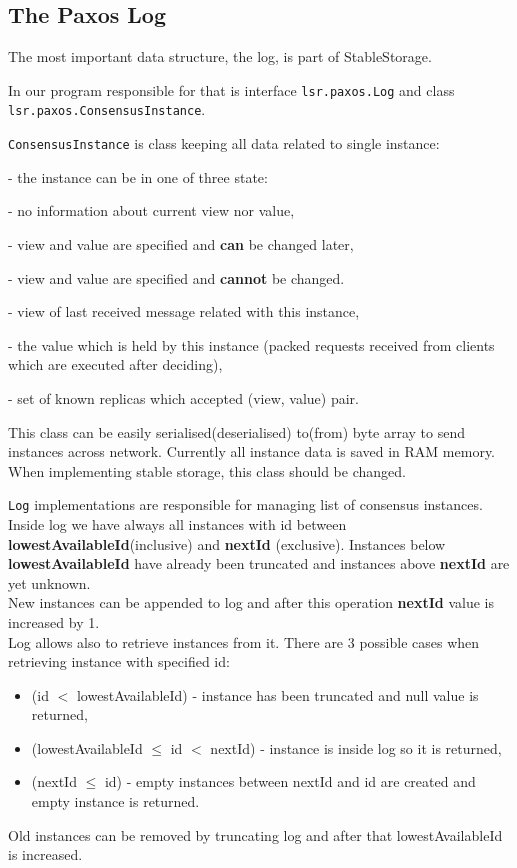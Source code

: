 \subsection{The Paxos Log}
\label{subsubsec:the_paxos_log}
The most important data structure, the log, is part of StableStorage.

In our program responsible for that is interface \texttt{lsr.paxos.Log} and class \texttt{lsr.paxos.Con\-sen\-susInstance}.

\texttt{ConsensusInstance} is class keeping all data related to single instance:
\begin{description}
  \setlength{\itemindent}{0pt}
  \item[state] - the instance can be in one of three state:
  \begin{description}
    \setlength{\itemindent}{0pt}
    \item[\tiny UNKNOWN] - no information about current view nor value,
    \item[\tiny KNOWN] - view and value are specified and \textbf{can} be changed later,
    \item[\tiny DECIDED] - view and value are specified and \textbf{cannot} be changed.
  \end{description}
  \item[view] - view of last received message related with this instance,
  \item[value] - the value which is held by this instance (packed requests received from clients which are executed after deciding),
  \item[accepts] - set of known replicas which accepted (view, value) pair.
\end{description}
This class can be easily serialised(deserialised) to(from) byte array to send instances across network. Currently all instance data is saved in RAM memory. When implementing stable storage, this class should be changed.

\texttt{Log} implementations are responsible for managing list of consensus instances. Inside log we have always all instances with id between \textbf{lowestAvailableId}(inclusive) and \textbf{nextId} (exclusive). Instances below \textbf{lowestAvailableId} have already been truncated and instances above \textbf{nextId} are yet unknown. \\New instances can be appended to log and after this operation \textbf{nextId} value is increased by 1. \\Log allows also to retrieve instances from it. There are 3 possible cases when retrieving instance with specified id:
\begin{itemize}
  \item (id $<$ lowestAvailableId) - instance has been truncated and null value is returned,
  \item (lowestAvailableId $\leq$ id $<$ nextId) - instance is inside log so it is returned,
  \item (nextId $\leq$ id) - empty instances between nextId and id are created and empty instance is returned.
\end{itemize}
Old instances can be removed by truncating log and after that lowestAvailableId is increased. 

